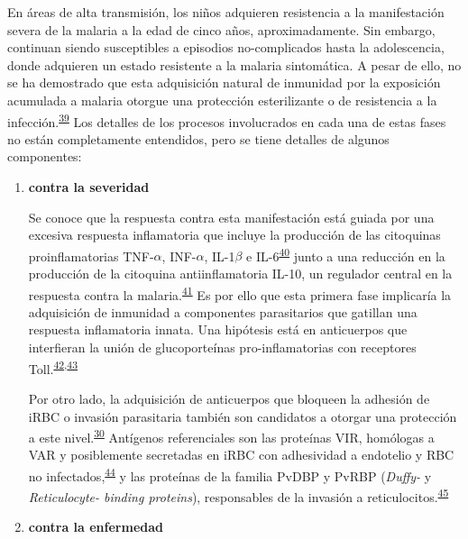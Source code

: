 \documentclass[]{article}
\begin{document}
\begin{enumerate}
\begin{enumerate}
    En áreas de alta transmisión, los niños adquieren resistencia a la
    manifestación severa de la malaria a la edad de cinco años,
    aproximadamente. Sin embargo, continuan siendo susceptibles a
    episodios no-complicados hasta la adolescencia, donde adquieren un
    estado resistente a la malaria sintomática. A pesar de ello, no se
    ha demostrado que esta adquisición natural de inmunidad por la
    exposición acumulada a malaria otorgue una protección esterilizante
    o de resistencia a la
    infección.\textsuperscript{\protect\hyperlink{ref-crompton2014rev}{39}}
    Los detalles de los procesos involucrados en cada una de estas fases
    no están completamente entendidos, pero se tiene detalles de algunos
    componentes:

    \begin{enumerate}
    \def\labelenumiii{\arabic{enumiii}.}
    \item
      \textbf{contra la severidad}

      Se conoce que la respuesta contra esta manifestación está guiada
      por una excesiva respuesta inflamatoria que incluye la producción
      de las citoquinas proinflamatorias TNF-\(\alpha\), INF-\(\alpha\),
      IL-1\(\beta\) e
      IL-6\textsuperscript{\protect\hyperlink{ref-baird2013}{40}} junto
      a una reducción en la producción de la citoquina antiinflamatoria
      IL-10, un regulador central en la respuesta contra la
      malaria.\textsuperscript{\protect\hyperlink{ref-jagannathan2014}{41}}
      Es por ello que esta primera fase implicaría la adquisición de
      inmunidad a componentes parasitarios que gatillan una respuesta
      inflamatoria innata. Una hipótesis está en anticuerpos que
      interfieran la unión de glucoporteínas pro-inflamatorias con
      receptores
      Toll.\textsuperscript{\protect\hyperlink{ref-schofield2006toll}{42},\protect\hyperlink{ref-coban2005toll}{43}}

      Por otro lado, la adquisición de anticuerpos que bloqueen la
      adhesión de iRBC o invasión parasitaria también son candidatos a
      otorgar una protección a este
      nivel.\textsuperscript{\protect\hyperlink{ref-wassmer2015}{30}}
      Antígenos referenciales son las proteínas VIR, homólogas a VAR y
      posiblemente secretadas en iRBC con adhesividad a endotelio y RBC
      no
      infectados,\textsuperscript{\protect\hyperlink{ref-portillo2001vir}{44}}
      y las proteínas de la familia PvDBP y PvRBP (\emph{Duffy-} y
      \emph{Reticulocyte- binding proteins}), responsables de la
      invasión a
      reticulocitos.\textsuperscript{\protect\hyperlink{ref-galinski1992rbp}{45}}
      \newpage
    \item
      \textbf{contra la enfermedad}


\end{enumerate}
\end{enumerate}
\end{enumerate}
\end{document}

